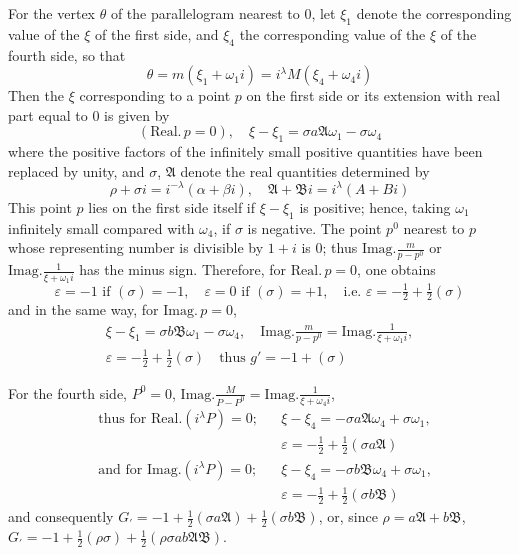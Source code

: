 For the vertex $\theta$ of the parallelogram nearest to $0$, let $\xi_1$ denote the corresponding value of the $\xi$ of the first side, and $\xi_4$ the corresponding value of the $\xi$ of the fourth side, so that
\[
\theta=m(\xi_1+\omega_1i)=i^\lambda M(\xi_4+\omega_4i)
\]
Then the $\xi$ corresponding to a point $p$ on the first side or its extension with real part equal to $0$ is given by
\[
(\mathrm{Real.}\,p=0),\quad\xi-\xi_1=\sigma a\mathfrak A\omega_1-\sigma\omega_4
\]
where the positive factors of the infinitely small positive quantities have been replaced by unity, and $\sigma$, $\mathfrak A$ denote the real quantities determined by
\[
\rho+\sigma i=i^{-\lambda}(\alpha+\beta i),\quad\mathfrak A+\mathfrak B i=i^\lambda(A+Bi)
\]
This point $p$ lies on the first side itself if $\xi-\xi_1$ is positive; hence, taking $\omega_1$ infinitely small compared with $\omega_4$, if $\sigma$ is negative. The point $p^0$ nearest to $p$ whose representing number is divisible by $1+i$ is $0$; thus
$\mathrm{Imag.}\frac m{p-p^0}$ or $\mathrm{Imag.}\frac1{\xi+\omega_1i}$ has the minus sign. Therefore, for $\mathrm{Real.}\,p=0$, one obtains
\[
\varepsilon=-1\text{ if }(\sigma)=-1,\quad\varepsilon=0\text{ if }(\sigma)=+1,\quad\text{i.e. }\varepsilon=-\tfrac12+\tfrac12(\sigma)
\]
and in the same way, for $\mathrm{Imag.}\,p=0$,
\[
\begin{gathered}
\xi-\xi_1=\sigma b\mathfrak B\omega_1-\sigma\omega_4,\quad\mathrm{Imag.}\frac m{p-p^0}=\mathrm{Imag.}\frac1{\xi+\omega_1i},\\
\varepsilon=-\tfrac12+\tfrac12(\sigma)\quad\text{thus }g'=-1+(\sigma)
\end{gathered}
\]

For the fourth side, $P^0=0$, $\mathrm{Imag.}\frac M{P-P^0}=\mathrm{Imag.}\frac1{\xi+\omega_4i}$,
\[
\begin{aligned}
&\text{thus for }\mathrm{Real.}(i^\lambda P)=0;&&\xi-\xi_4=-\sigma a\mathfrak A\omega_4+\sigma\omega_1,\\
&&&\varepsilon=-\tfrac12+\tfrac12(\sigma a\mathfrak A)\\
&\text{and for }\mathrm{Imag.}(i^\lambda P)=0;&&\xi-\xi_4=-\sigma b\mathfrak B\omega_4+\sigma\omega_1,\\
&&&\varepsilon=-\tfrac12+\tfrac12(\sigma b\mathfrak B)
\end{aligned}
\]
and consequently $G_{\prime}=-1+\tfrac12(\sigma a\mathfrak A)+\tfrac12(\sigma b\mathfrak B)$, or, since $\rho=a\mathfrak A+b\mathfrak B$, $G_{\prime}=-1+\tfrac12(\rho\sigma)+\tfrac12(\rho\sigma ab\mathfrak A\mathfrak B)$.

